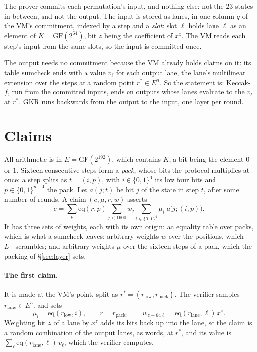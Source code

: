 \documentclass[11pt]{article}
\newcommand{\E}{E}
\newcommand{\K}{K}
\newcommand{\eq}{\mathrm{eq}}
\newcommand{\cube}[1]{\{0,1\}^{#1}}
\begin{document}
The prover commits each permutation's input, and nothing else: not the $23$ states in between, and not the output. The input is stored as lanes, in one column $q$ of the VM's commitment, indexed by a step and a \emph{slot}: slot $\ell$ holds lane $\ell$ as an element of $\K = \mathrm{GF}(2^{64})$, bit $z$ being the coefficient of $x^z$. The VM reads each step's input from the same slots, so the input is committed once.

The output needs no commitment because the VM already holds claims on it: its table sumcheck ends with a value $v_\ell$ for each output lane, the lane's multilinear extension over the steps at a random point $r^* \in \E^n$. So the statement is: Keccak-$f$, run from the committed inputs, ends on outputs whose lanes evaluate to the $v_\ell$ at $r^*$. GKR runs backwards from the output to the input, one layer per round.

\section{Claims}

All arithmetic is in $\E = \mathrm{GF}(2^{192})$, which contains $\K$, a bit being the element $0$ or $1$. Sixteen consecutive steps form a \emph{pack}, whose bits the protocol multiplies at once: a step splits as $t = (i, p)$, with $i \in \cube{4}$ its low four bits and $p \in \cube{n-4}$ the pack. Let $a(j; t)$ be bit $j$ of the state in step $t$, after some number of rounds. A claim $(c, \mu, r, w)$ asserts
\begin{equation}\label{eq:claim}
c = \sum_{p} \eq(r, p) \sum_{j < 1600} w_j \sum_{i \in \cube{4}} \mu_i \; a\bigl(j; (i, p)\bigr).
\end{equation}
It has three sets of weights, each with its own origin: an equality table over packs, which is what a sumcheck leaves; arbitrary weights $w$ over the positions, which $L^\top$ scrambles; and arbitrary weights $\mu$ over the sixteen steps of a pack, which the packing of \S\ref{sec:layer} sets.

\paragraph{The first claim.} It is made at the VM's point, split as $r^* = (r_{\mathrm{low}}, r_{\mathrm{pack}})$. The verifier samples $r_{\mathrm{lane}} \in \E^5$, and sets
\[
\mu_i = \eq(r_{\mathrm{low}}, i), \qquad r = r_{\mathrm{pack}}, \qquad w_{z + 64\ell} = \eq(r_{\mathrm{lane}}, \ell)\, x^z.
\]
Weighting bit $z$ of a lane by $x^z$ adds its bits back up into the lane, so the claim is a random combination of the output lanes, as words, at $r^*$, and its value is $\sum_\ell \eq(r_{\mathrm{lane}}, \ell)\, v_\ell$, which the verifier computes.
\end{document}
